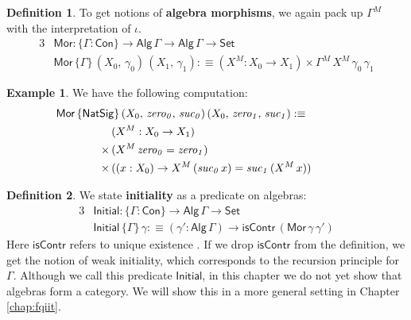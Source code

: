 \documentclass[12pt,a4paper,twoside,openany]{book}
\theoremstyle{remark}
\theoremstyle{definition}
\newtheorem{mydefinition}{Definition}
\newtheorem{myexample}{Example}
\theoremstyle{theorem}
\newcommand{\mi}[1]{\mathit{#1}}
\newcommand{\ms}[1]{\mathsf{#1}}
\newcommand{\Con}{\mathsf{Con}}
\newcommand{\Set}{\mathsf{Set}}
\newcommand{\NatSig}{\mathsf{NatSig}}
\newcommand{\Alg}{\ms{Alg}}
\newcommand{\Mor}{\ms{Mor}}
\newcommand{\Initial}{\ms{Initial}}
\newcommand{\defn}{:\equiv}
\begin{document}
\begin{mydefinition}
\label{def:simple-morphism}
To get notions of \textbf{algebra morphisms}, we again pack up $\Gamma^M$ with
the interpretation of $\iota$.
\begin{alignat*}{3}
  & \Mor : \{\Gamma : \Con\} \to \Alg\,\Gamma \to \Alg\,\Gamma \to \Set \\
  & \Mor\,\{\Gamma\}\,(X_0,\,\gamma_0)\,(X_1,\,\gamma_1) \defn (X^M : X_0 \to X_1) \times \Gamma^M\,X^M\,\gamma_0\,\gamma_1
\end{alignat*}
\end{mydefinition}
\begin{myexample} We have the following computation:
\begin{alignat*}{3}
  & \hspace{-5em}\rlap{$\Mor\,\{\NatSig\}\,(X_0,\,\mi{zero_0},\,\mi{suc_0})\,(X_0,\,\mi{zero_1},\,\mi{suc_1}) \defn$} \\
           &(X^M : X_0 \to X_1) \\
   \times\,&(X^M\,\mi{zero_0} = \mi{zero_1}) \\
   \times\,&((x : X_0) \to X^M\,(\mi{suc_0}\,x) = \mi{suc_1}\,(X^M\,x))
\end{alignat*}
\end{myexample}

\begin{mydefinition} We state \textbf{initiality} as a predicate on algebras:
\begin{alignat*}{3}
  & \Initial : \{\Gamma : \Con\} \to \Alg\,\Gamma \to \Set\\
  & \Initial\,\{\Gamma\}\,\gamma \defn
    (\gamma' : \Alg\,\Gamma) \to \ms{isContr}\,(\Mor\,\gamma\,\gamma')
\end{alignat*}
Here $\ms{isContr}$ refers to unique existence \cite[Section 3.11]{hottbook}. If we drop
$\ms{isContr}$ from the definition, we get the notion of weak initiality, which
corresponds to the recursion principle for $\Gamma$. Although we call this
predicate $\Initial$, in this chapter we do not yet show that algebras form a
category. We will show this in a more general setting in Chapter \ref{chap:fqiit}.

\end{mydefinition}
\end{document}
